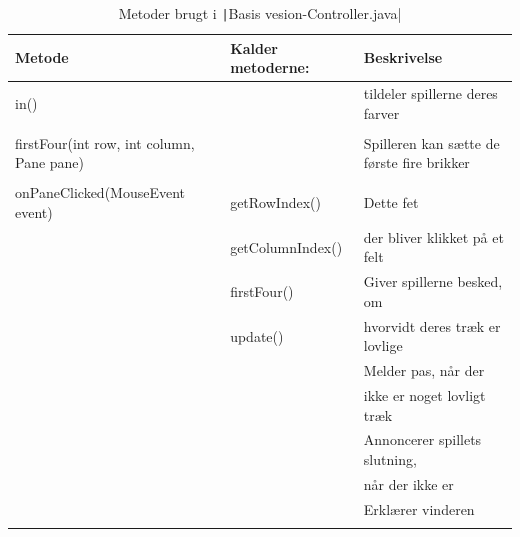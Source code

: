 \subsubsection{}
\begin{table}[H]
    \centering
    \caption{Metoder brugt i \texttt|Basis vesion-Controller.java|}\label{tbl:1}
    \begin{tabular}{lll}
        \toprule
    Metode          & Kalder metoderne: & Beskrivelse                                                         \\
        \midrule
       in()         &   & tildeler spillerne deres farver
             \\
             \\
        firstFour(int row, int column, Pane pane)   &  & Spilleren kan sætte de første fire brikker
        \\
        \\
         onPaneClicked(MouseEvent event) & getRowIndex()     & Dette fet                                         \\
                        & getColumnIndex()  & der bliver klikket på et felt                                     \\
                        & firstFour()       & Giver spillerne besked, om                                        \\
                        & update()  & hvorvidt deres træk er lovlige                                    \\
                        &                & Melder pas, når der                                               \\
                        &                & ikke er noget lovligt træk                                        \\
                        &                     & Annoncerer spillets slutning,                                     \\
                        &                   & når der ikke er                                                   \\
                        &                    & Erklærer vinderen                                      \\
                        &                   &                                                                   \\
                        

\end{tabular}
\end{table}
